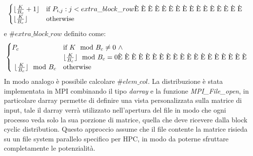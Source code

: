 \documentclass[conference]{IEEEtran}
\begin{document}
\begin{equation}
    \begin{cases}
        \lfloor\frac{K}{B_c}+1\rfloor &  \text{if}\ P_{i,j} : j<extra\_block\_row \text{\char200{}}\ \text{\char200{}}\ \text{\char200{}}\ \text{\char200{}}\ \text{\char200{}}\ \text{\char200{}}\ \text{\char200{}}\ \text{\char200{}}\ \text{\char200{}}\ \text{\char200{}}\ \text{\char200{}}\ \text{\char200{}}\ \text{\char200{}}\ \text{\char200{}}\ \text{\char200{}}\ \text{\char200{}}\  \\
        \lfloor\frac{K}{B_c}\rfloor & \text{otherwise} \\
    \end{cases} 
\end{equation}
e $\#extra\_block\_row$ definito come:
\begin{equation}
    \begin{cases}
        P_c &  \text{if}\ K \mod B_c \neq 0 \ \land \\
        & \lfloor\frac{K}{B_c}\rfloor \mod B_c=0  \text{\char200{}}\ \text{\char200{}}\ \text{\char200{}}\ \text{\char200{}}\ \text{\char200{}}\ \text{\char200{}}\ \text{\char200{}}\ \text{\char200{}}\ \text{\char200{}}\ \text{\char200{}}\ \text{\char200{}}\ \text{\char200{}}\ \text{\char200{}}\ \text{\char200{}}\ \text{\char200{}}\ \text{\char200{}}\ \text{\char200{}}\ \text{\char200{}}\ \text{\char200{}}\\\
        \lfloor\frac{K}{B_c}\rfloor \mod B_c & \text{otherwise}\\
    \end{cases} 
\end{equation}
In modo analogo è possibile calcolare $\#elem\_col$.
La distribuzione è stata implementata in MPI combinando il tipo \textit{darray} e la funzione \textit{MPI\_File\_open}, in particolare darray permette di definire una vista personalizzata sulla matrice di input, tale il darray verrà utilizzato nell'apertura del file in modo che ogni processo veda solo la sua porzione di matrice, quella che deve ricevere dalla block cyclic distribution. Questo approccio assume che il file contente la matrice risieda su un file system parallelo specifico per HPC, in modo da poterne sfruttare completamente le potenzialità.
\end{document}
